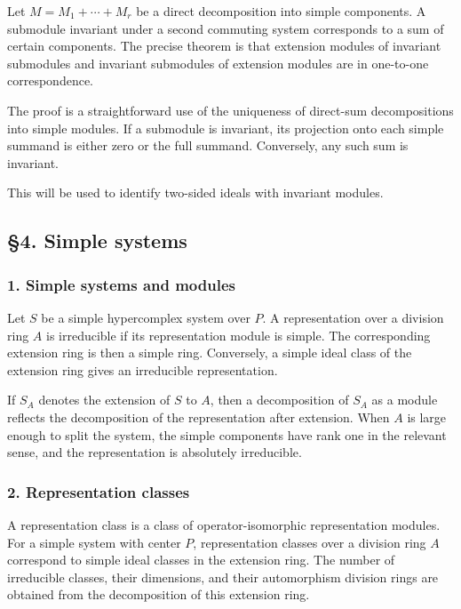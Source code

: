 \documentclass[
  11pt,
]{article}
\begin{document}
Let \(M=M_1+\cdots+M_r\) be a direct decomposition into simple
components. A submodule invariant under a second commuting system
corresponds to a sum of certain components. The precise theorem is that
extension modules of invariant submodules and invariant submodules of
extension modules are in one-to-one correspondence.

The proof is a straightforward use of the uniqueness of direct-sum
decompositions into simple modules. If a submodule is invariant, its
projection onto each simple summand is either zero or the full summand.
Conversely, any such sum is invariant.

This will be used to identify two-sided ideals with invariant modules.

\subsection{§4. Simple systems}\label{simple-systems}

\subsubsection{1. Simple systems and
modules}\label{simple-systems-and-modules}

Let \(S\) be a simple hypercomplex system over \(P\). A representation
over a division ring \(A\) is irreducible if its representation module
is simple. The corresponding extension ring is then a simple ring.
Conversely, a simple ideal class of the extension ring gives an
irreducible representation.

If \(S_A\) denotes the extension of \(S\) to \(A\), then a decomposition
of \(S_A\) as a module reflects the decomposition of the representation
after extension. When \(A\) is large enough to split the system, the
simple components have rank one in the relevant sense, and the
representation is absolutely irreducible.

\subsubsection{2. Representation classes}\label{representation-classes}

A representation class is a class of operator-isomorphic representation
modules. For a simple system with center \(P\), representation classes
over a division ring \(A\) correspond to simple ideal classes in the
extension ring. The number of irreducible classes, their dimensions, and
their automorphism division rings are obtained from the decomposition of
this extension ring.
\end{document}
